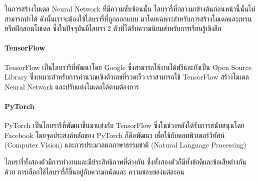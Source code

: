 ในการสร้างโมเดล Neural Network ที่มีความซับซ้อนนั้น ไลบรารี่ที่กลางมาข้างต้นก่อนหน้านี้นั้นไม่สามารถทำได้ ดังนั้นเราจะต้องใช้ไลบรารี่ที่ถูกออกแบบ%
มาโดยเฉพาะสำหรับการสร้างโมเดลและเทรนหรือฝึกสอนโมเดล ซึ่งในปัจจุบันมีไลบรา 2 ตัวที่ได้รับความนิยมสำหรับการเรียนรู้เชิงลึก 

\paragraph{TensorFlow}
TensorFlow เป็นไลบรารีที่พัฒนาโดย Google ซึ่งสามารถใช้งานได้ฟรีและยังเป็น Open Source Library ซึ่งเหมาะสำหรับการคำนวณเชิงตัวเลขที่รวดเร็ว 
เราสามารถใช้ TensorFlow สร้างโมเดล Neural Network และปรับแต่งโมเดลได้ตามต้องการ

\paragraph{PyTorch} 
PyTorch เป็นไลบรารีที่พัฒนาขึ้นมาแข่งกับ TensorFlow ซึ่งในช่วงหลังได้รับการสนับสนุนโดย Facebook โดยจุดประสงค์หลักของ PyTorch ก็คือพัฒนา%
เพื่อใช้กับคอมพิวเตอร์วิทัศน์ (Computer Vision) และการประมวลผลภาษาธรรมชาติ (Natural Language Processing) 

ไลบรารี่ทั้งสองตัวมีการทำงานและมีประสิทธิภาพที่ต่างกัน ซึ่งทั้งสองตัวก็มีทั้งข้อดีและข้อเสียต่างกันด้วย การเลือกใช้ไลบรารี่ก็ขึ้นอยู่กับความถนัดและ%
ความชอบของแต่ละคน

